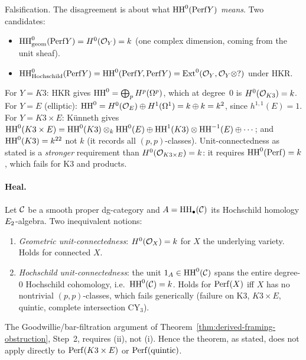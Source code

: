 Falsification. The disagreement is about what $\mathrm{HH}^0(\mathrm{Perf} Y)$
\emph{means}. Two candidates:
\begin{itemize}
\item $\mathrm{HH}^0_{\mathrm{geom}}(\mathrm{Perf} Y) = H^0(\mathcal{O}_Y) = k$ (one complex
dimension, coming from the unit sheaf).

\item $\mathrm{HH}^0_{\mathrm{Hochschild}}(\mathrm{Perf} Y) = \mathrm{HH}^0(\mathrm{Perf} Y, \mathrm{Perf} Y)
= \mathrm{Ext}^0(\mathcal{O}_Y, \mathcal{O}_Y \otimes ?)$ under HKR.
\end{itemize}
For $Y = K3$: HKR gives $\mathrm{HH}^0 = \bigoplus_{p} H^p(\Omega^p)$,
which at degree~$0$ is $H^0(\mathcal{O}_{K3}) = k$. For $Y = E$
(elliptic): $\mathrm{HH}^0 = H^0(\mathcal{O}_E) \oplus H^1(\Omega^1) = k \oplus k = k^2$,
since $h^{1,1}(E) = 1$. For $Y = K3 \times E$: K\"unneth
gives $\mathrm{HH}^0(K3 \times E) = \mathrm{HH}^0(K3) \otimes_k \mathrm{HH}^0(E) \oplus
\mathrm{HH}^1(K3) \otimes \mathrm{HH}^{-1}(E) \oplus \cdots$; and $\mathrm{HH}^0(K3) = k^{22}$
not $k$ (it records all $(p,p)$-classes). Unit-connectedness as
stated is a \emph{stronger} requirement than $H^0(\mathcal{O}_{K3 \times E}) = k$:
it requires $\mathrm{HH}^0(\mathrm{Perf}) = k$, which fails for K3 and
products.

\paragraph{Heal.}

\begin{theorem}
\label{thm:gelfand-unit-connected}
\ClaimStatusDerivation{}
Let $\mathcal{C}$ be a smooth proper dg-category and $A = \mathrm{HH}_\bullet(\mathcal{C})$
its Hochschild homology $E_2$-algebra. Two inequivalent notions:
\begin{enumerate}[label=\textup{(\roman*)}]
\item \emph{Geometric unit-connectedness}: $H^0(\mathcal{O}_X) = k$ for
$X$ the underlying variety. Holds for connected $X$.

\item \emph{Hochschild unit-connectedness}: the unit
$1_A \in \mathrm{HH}^0(\mathcal{C})$ spans the entire degree-$0$ Hochschild
cohomology, i.e.\ $\mathrm{HH}^0(\mathcal{C}) = k$. Holds for
$\mathrm{Perf}(X)$ iff $X$ has no nontrivial $(p,p)$-classes, which
fails generically (failure on K3, $K3 \times E$, quintic,
complete intersection CY$_3$).
\end{enumerate}
The Goodwillie/bar-filtration argument of
Theorem~\ref{thm:derived-framing-obstruction}, Step~2, requires
\textup{(ii)}, not \textup{(i)}. Hence the theorem, as stated,
does not apply directly to $\mathrm{Perf}(K3 \times E)$ or
$\mathrm{Perf}(\text{quintic})$.
\end{theorem}

